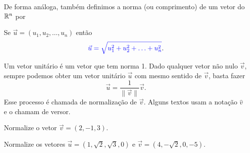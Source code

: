 \begin{frame}[label=vetores]
De forma análoga, também definimos a {\color{blue} norma (ou comprimento)} de um vetor do $\mathbb{R}^n$ por
\begin{center}
\begin{minipage}{0.7\textwidth}
\begin{block}{}
Se {\color{blue}$\vec{u}=(u_1,u_2,\ldots,u_n)$} então
\[{\color{blue}\vec{u}=\sqrt{u_1^2+u_2^2+\ldots+u_n^2}}.\]
\end{block}
\end{minipage}
\end{center}

Um {\color{blue} vetor unitário} é um vetor que tem norma 1. Dado qualquer vetor não nulo $\vec{v}$, sempre podemos obter um {\color{blue}vetor unitário} $\vec{u}$ com mesmo sentido de $\vec{v}$, basta fazer
\[\vec{u}=\frac{1}{\|\vec{v}\|}\vec{v}.\]
Esse processo é chamada de {\color{blue} normalização} de $\vec{v}$. Alguns textos usam a notação $\hat{v}$ e o chamam de {\color{blue}versor}.


\end{frame}

\begin{frame}[label=vetores]


\begin{exe}
Normalize o vetor $\vec{v}=(2,-1,3)$.
\end{exe}



\begin{casa}
Normalize os vetores $\vec{u}=(1,\sqrt{2},\sqrt{3},0)$ e $\vec{v}=(4,-\sqrt{2},0,-5)$.
\end{casa}
\end{frame}




